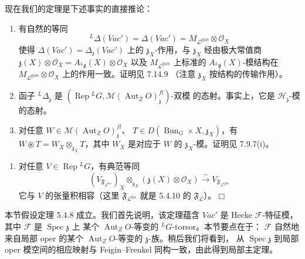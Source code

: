 现在我们的定理是下述事实的直接推论：

\begin{enumerate}[label=(\alph*),leftmargin=2.6em]
\item 有自然的等同
\begin{equation}\tag{283}
{}^{L}\Delta(\mathit{Vac}')=\Delta(\mathit{Vac}')
=M_{\mathcal{L}^{\mathrm{glob}}}\otimes\mathcal{O}_X
\end{equation}
使得 $\Delta(\mathit{Vac}')=\Delta_{\mathfrak{z}}(\mathit{Vac}')$ 上的
$\mathfrak{z}_X$-作用，与 $\mathfrak{z}_X$ 经由极大常值商
$\mathfrak{z}(X)\otimes\mathcal{O}_X=A_{{}^{L}\mathfrak{g}}(X)\otimes\mathcal{O}_X$
以及 $M_{\mathcal{L}^{\mathrm{glob}}}$ 上标准的 $A_{{}^{L}\mathfrak{g}}(X)$-模结构在
$M_{\mathcal{L}^{\mathrm{glob}}}\otimes\mathcal{O}_X$ 上的作用一致。证明见 7.14.9
（注意 $\mathfrak{z}_X$ 按结构的传输作用）。
\item 函子 ${}^{L}\Delta_{\mathfrak{z}}$ 是
$(\operatorname{Rep}{}^{L}G,\mathcal{M}(\operatorname{Aut}_ZO)^{fl}_{\mathfrak{z}})$-双模
的态射。事实上，它是 $\mathcal{H}_{\mathfrak{z}}$-模的态射。
\item 对任意 $W\in\mathcal{M}(\operatorname{Aut}_ZO)^{fl}_{\mathfrak{z}}$、
$T\in D(\operatorname{Bun}_G\times X,\mathfrak{z}_X)$，有
$W\circledast T=W_X\otimes_{\mathfrak{z}_X}T$，其中 $W_X$ 是对应于 $W$ 的
$\mathfrak{z}_X$-模。证明见 7.9.7(i)。
\end{enumerate}


\begin{enumerate}[label=(\alph*),leftmargin=2.6em]
\item[(d)] 对任意 $V\in\operatorname{Rep}{}^{L}G$，有典范等同
\[
(V_{\mathfrak{F}_{\mathcal{L}^{\mathrm{loc}}}})_X\otimes_{\mathfrak{z}_X}
(\mathfrak{z}(X)\otimes\mathcal{O}_X)\xrightarrow{\sim}
V_{\mathfrak{F}_{\mathcal{L}^{\mathrm{glob}}}}
\]
它与 $V$ 的张量积相容（这里 $\mathfrak{F}_{\mathcal{L}^{\mathrm{loc}}}$ 就是 5.4.10 的
$\mathfrak{F}_{\mathcal{L}}$）。\hfill$\Box$
\end{enumerate}


本节假设定理 5.4.8 成立。我们首先说明，该定理蕴含 $\mathit{Vac}'$ 是 Hecke
$\mathcal{F}$-特征模，其中 $\mathcal{F}$ 是 $\operatorname{Spec}\mathfrak{z}$ 上
某个 $\operatorname{Aut}_ZO$-等变的 ${}^{L}G$-torsor。本节要点在于：
$\mathcal{F}$ 自然地来自局部 oper 的某个 $\operatorname{Aut}_ZO$-等变的
$\mathfrak{z}$-族。稍后我们将看到，
从 $\operatorname{Spec}\mathfrak{z}$ 到局部 oper 模空间的相应映射与
Feigin--Frenkel 同构一致，由此得到局部主定理。

